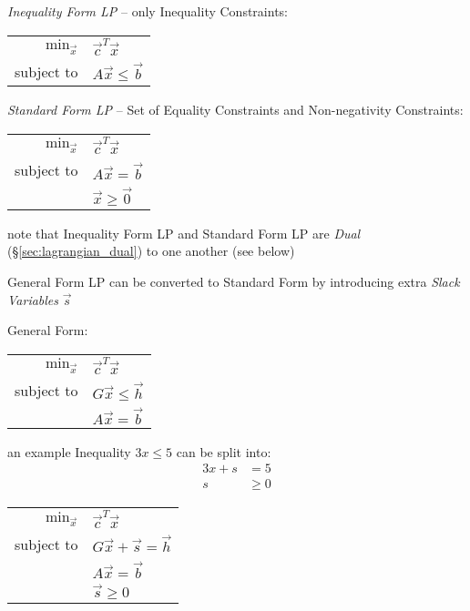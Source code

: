 \emph{Inequality Form LP} -- only Inequality Constraints:

\begin{tabular}{r l}
  $\mathrm{min}_{\vec{x}}$ & $\vec{c}^T\vec{x}$      \\
  subject to               & $A\vec{x} \leq \vec{b}$ \\
\end{tabular}

\emph{Standard Form LP} -- Set of Equality Constraints and Non-negativity
Constraints:

\begin{tabular}{r l}
  $\mathrm{min}_{\vec{x}}$ & $\vec{c}^T\vec{x}$     \\
  subject to               & $A\vec{x} = \vec{b}$   \\
                           & $\vec{x} \geq \vec{0}$ \\
\end{tabular}

note that Inequality Form LP and Standard Form LP are \emph{Dual}
(\S\ref{sec:lagrangian_dual}) to one another (see below)

General Form LP can be converted to Standard Form by introducing extra
\emph{Slack Variables} $\vec{s}$

General Form:

\begin{tabular}{r l}
  $\mathrm{min}_{\vec{x}}$ & $\vec{c}^T\vec{x}$     \\
  subject to               & $G\vec{x} \leq \vec{h}$   \\
                           & $A\vec{x} = \vec{b}$ \\
\end{tabular}

an example Inequality $3x \leq 5$ can be split into:
\begin{align*}
  3x + s & = 5 \\
  s      & \geq 0
\end{align*}

\begin{tabular}{r l}
  $\mathrm{min}_{\vec{x}}$ & $\vec{c}^T\vec{x}$     \\
  subject to               & $G\vec{x} + \vec{s} = \vec{h}$   \\
                           & $A\vec{x} = \vec{b}$ \\
                           & $\vec{s} \geq 0$ \\
\end{tabular}

